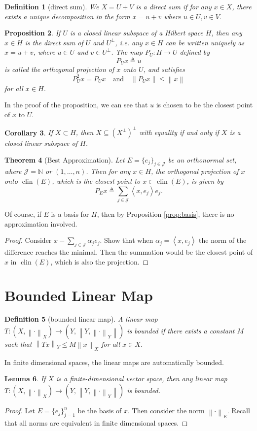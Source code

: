 \documentclass[12pt,a4paper]{report}
\numberwithin{equation}{section}
\theoremstyle{mystyle}
\newtheorem{definition}{Definition}[section]
\newtheorem{theorem}[definition]{Theorem}
\newtheorem{lemma}[definition]{Lemma}
\newtheorem{corollary}[definition]{Corollary}
\newtheorem{proposition}[definition]{Proposition}
\newcommand{\N}{\mathbb{N}}
\newcommand{\norm}[1]{\left\lVert #1 \right\rVert}
\newcommand{\inner}[1]{\left\langle #1 \right\rangle}
\newcommand{\clin}{\operatorname{clin}}
\begin{document}
	\begin{definition}[direct sum]
		We $X=U+V$ is a direct sum if for any $x\in X$, there exists a unique decomposition in the form $x=u+v$ where $u\in U, v\in V$.
	\end{definition}
	
	\begin{proposition}
		If $U$ is a closed linear subspace of a Hilbert space $H$, then any $x\in H$ is the direct sum of $U$ and $U^\perp$, i.e. any $x\in H$ can be written uniquely as $x=u+v$, where $u\in U$ and $v\in U^\perp$. The map $P_U: H\to U$ defined by
		$$
		P_U x \triangleq u
		$$ 
		is called the orthogonal projection of $x$ onto $U$, and satisfies
		$$
		P^2_U x = P_U x \quad \text{and} \quad \norm{P_U x} \leq \norm{x}
		$$
		for all $x\in H$.
	\end{proposition}
	In the proof of the proposition, we can see that $u$ is chosen to be the closest point of $x$ to $U$.
	\begin{corollary}
		If $X\subset H$, then $X\subseteq (X^\perp)^\perp$ with equality if and only if $X$ is a closed linear subspace of $H$.
	\end{corollary}
	
	\begin{theorem}[Best Approximation]
		Let $E=\{e_j\}_{j\in \mathscr{J}}$ be an orthonormal set, where $\mathscr{J}=\N$ or $(1,\dots,n)$. Then for any $x\in H$, the orthogonal projection of $x$ onto $\clin(E)$, which is the closest point to $x\in \clin(E)$, is given by
		$$
		P_E x \triangleq \sum_{j\in \mathscr{J}}\inner{x,e_j}e_j.
		$$
	\end{theorem}
	Of course, if $E$ is a basis for $H$, then by Proposition \ref{prop:basis}, there is no approximation involved.
	\begin{proof}
		Consider $x-\sum_{j\in \mathscr{J}}\alpha_j e_j$. Show that when $\alpha_j=\inner{x,e_j}$ the norm of the difference reaches the minimal. Then the summation would be the closest point of $x$ in $\clin(E)$, which is also the projection.
	\end{proof}
	
	
	\section{Bounded Linear Map}
	\begin{definition}[bounded linear map]
		A linear map $T:(X,\norm{\cdot}_X)\to(Y,\norm{Y,\norm{\cdot}_Y})$ is \emph{bounded} if there exists a constant $M$ such that $\norm{Tx}_Y \leq M \norm{x}_X$ for all $x\in X$.
	\end{definition}
	In finite dimensional spaces, the linear maps are automatically bounded.
	\begin{lemma}
		If $X$ is a finite-dimensional vector space, then any linear map $T:(X,\norm{\cdot}_X)\to(Y,\norm{Y,\norm{\cdot}_Y})$ is bounded.
	\end{lemma}
	\begin{proof}
		Let $E=\{e_j\}_{j=1}^n$ be the basis of $x$. Then consider the norm $\norm{\cdot}_E$. Recall that all norms are equivalent in finite dimensional spaces.
	\end{proof}
	
\end{document}
